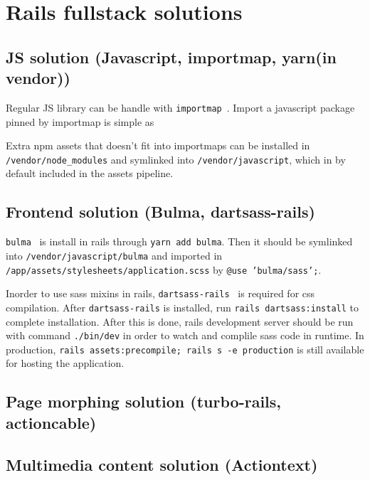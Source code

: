 \chapter{Rails fullstack solutions}
\section{JS solution (Javascript, importmap, yarn(in vendor))}

Regular JS library can be handle with \texttt{importmap}~\cite{importmap-rails}. Import a javascript package 
pinned by importmap is simple as 

Extra npm assets that doesn't fit into importmaps can be installed in \texttt{/vendor/node_modules} and 
symlinked into \texttt{/vendor/javascript}, which in by default included in the assets pipeline.


\section{Frontend solution (Bulma, dartsass-rails)}

\texttt{bulma}~\cite{bulma} is install in rails through \texttt{yarn add bulma}. Then it should be 
symlinked into \texttt{/vendor/javascript/bulma} and imported in 
\texttt{/app/assets/stylesheets/application.scss} by \texttt{@use 'bulma/sass';}.

Inorder to use sass mixins in rails, \texttt{dartsass-rails}~\cite{dartsass-rails} is required for css 
compilation. After \texttt{dartsass-rails} is installed, run \texttt{rails dartsass:install} to 
complete installation. After this is done, rails development server should be run with command 
\texttt{./bin/dev} in order to watch and complile sass code in runtime. In production, \texttt{rails 
assets:precompile; rails s -e production} is still available for hosting the application.

\section{Page morphing solution (turbo-rails, actioncable)}

\section{Multimedia content solution (Actiontext)}

